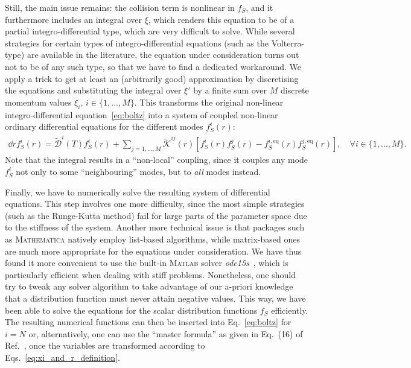 Still, the main issue remains: the collision term is nonlinear in $f_S$, and it furthermore includes an integral over $\xi$, which renders this equation to be of a partial integro-differential type, which are very difficult to solve. While several strategies for certain types of integro-differential equations (such as the Volterra-type) are available in the literature, the equation under consideration turns out not to be of any such type, so that we have to find a dedicated workaround. We apply a trick to get at least an (arbitrarily good) approximation by discretising the equations and substituting the integral over $\xi'$ by a finite sum over $M$ discrete momentum values $\xi_i,\, i\in\{1,...,M\}$. This transforms the original non-linear integro-differential equation~\eqref{eq:boltz} into a system of coupled non-linear ordinary differential equations for the different modes $f_S^i\left(r\right)$:
\begin{align}
 \dd{r} f_S^i\left(r\right) = \tilde{\mathcal{D}}^i\left(T\right) f_S^i\left(r\right) 
 + \sum\limits_{j=1,...,M}^{}{\tilde{\mathcal{K}}^{ij}\left(r\right)} \left[f_S^i\left(r\right)f_S^j\left(r\right) - f_S^{i,\mathrm{eq}}\left(r\right)f_S^{j,\mathrm{eq}}\left(r\right)  \right], \quad \forall i \in\{1,\dots,M \}.
\end{align}
Note that the integral results in a ``non-local'' coupling, since it couples any mode $f_S^i$ not only to some ``neighbouring'' modes, but to \emph{all} modes instead.

Finally, we have to numerically solve the resulting system of differential equations. This step involves one more difficulty, since the most simple strategies (such as the Runge-Kutta method) fail for large parts of the parameter space due to the stiffness of the system. Another more technical issue is that packages such as \textsc{Mathematica} natively employ list-based algorithms, while matrix-based ones are much more appropriate for the equations under consideration. We have thus found it more convenient to use the built-in \textsc{Matlab} solver \textit{ode15s}~\cite{Matlab:ode15s:reference1,Matlab:ode15s:reference2},  which is particularly efficient when dealing with stiff problems. Nonetheless, one should try to tweak any solver algorithm to take advantage of our a-priori knowledge that a distribution function must never attain negative values.
This way, we have been able to solve the equations for the scalar distribution functions $f_S$ efficiently. The resulting numerical functions can then be inserted into Eq.~\eqref{eq:boltz} for $i=N$ or, alternatively, one can use the ``master formula'' as given in Eq.~(16) of Ref.~\cite{Merle:2015oja}, once the variables are transformed according to Eqs.~\eqref{eq:xi_and_r_definition}.

